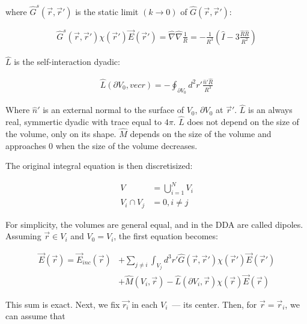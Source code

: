             where $\hat{G}^s(\vec{r}, \vec{r}')$ is the static limit $(k \rightarrow 0)$ of $\hat{G}(\vec{r}, \vec{r}')$:

            \begin{align}
                \hat{G}^s(\vec{r}, \vec{r}')\chi(\vec{r}')\vec{E}(\vec{r}') = \hat{\nabla}\hat{\nabla}\frac{1}{R}
                                                    = -\frac{1}{R^3}\left(\hat{I}-3\frac{\hat{R}\hat{R}}{R^2}\right)
            \end{align}

            $\hat{L}$ is the self-interaction dyadic:

            \begin{align}
                \hat{L}(\partial V_0, vec{r}) = -\oint_{\partial V_0} d^2 r' \frac{\hat{n}'\hat{R}}{R^3}
            \end{align}

            Where $\hat{n}'$ is an external normal to the surface of $V_0$, $\partial V_0$ at $\vec{r}'$. $\hat{L}$ is an always real, symmertic dyadic
            with trace equal to $4\pi$. $\hat{L}$ does not depend on the size of the volume, only on its shape. $\hat{M}$ depends on the size of the
            volume and approaches $0$ when the size of the volume decreases.

            The original integral equation is then discretisized:

            \begin{align}
                V &= \bigcup^N_{i=1}V_i \\
                V_i \cap V_j &= 0, i \neq j
            \end{align}

            For simplicity, the volumes are general equal, and in the DDA are called dipoles. Assuming $\vec{r} \in V_i$ and $V_0 = V_i$, the first
            equation becomes:

            \begin{align}
                \vec{E}(\vec{r}) = \vec{E}_{inc}(\vec{r}) &+ \sum_{j\neq i} \int_{V_j} d^3 r'\hat{G}(\vec{r}, \vec{r}')\chi(\vec{r}')\vec{E}(\vec{r}') \nonumber\\
                                                        &+ \hat{M}(V_i, \vec{r}) - \hat{L}(\partial V_i, \vec{r})\chi(\vec{r})\vec{E}(\vec{r})
            \end{align}

            This sum is exact. Next, we fix $\vec{r_i}$ in each $V_i$~--- its center. Then, for $\vec{r}=\vec{r}_i$, we can assume that

